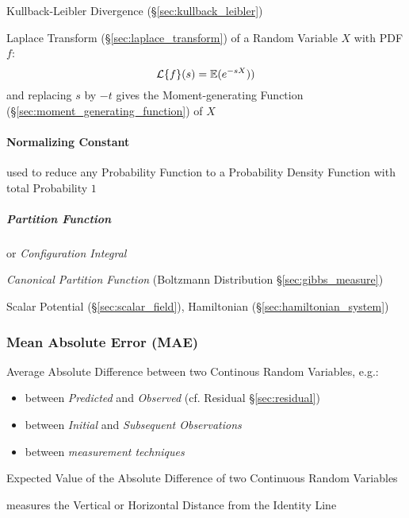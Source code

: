 \fist Kullback-Leibler Divergence (\S\ref{sec:kullback_leibler})

Laplace Transform (\S\ref{sec:laplace_transform}) of a Random Variable $X$ with
PDF $f$:
\[
  \mathcal{L}\{f\}(s) = \mathbb{E}(e^{-sX}))
\]
and replacing $s$ by $-t$ gives the Moment-generating Function
(\S\ref{sec:moment_generating_function}) of $X$



\paragraph{Normalizing Constant}\label{sec:normalizing_constant}\hfill

used to reduce any Probability Function to a Probability Density Function with
total Probability $1$





\subparagraph{Partition Function}\label{sec:partition_function}\hfill

or \emph{Configuration Integral}

\emph{Canonical Partition Function} (Boltzmann Distribution
\S\ref{sec:gibbs_measure})

Scalar Potential (\S\ref{sec:scalar_field}), Hamiltonian
(\S\ref{sec:hamiltonian_system})



\subsubsection{Mean Absolute Error (MAE)}\label{sec:mae}

Average Absolute Difference between two Continous Random Variables, e.g.:
\begin{itemize}
  \item between \emph{Predicted} and \emph{Observed} (cf. Residual
    \S\ref{sec:residual})
  \item between \emph{Initial} and \emph{Subsequent Observations}
  \item between \emph{measurement techniques}
\end{itemize}

Expected Value of the Absolute Difference of two Continuous Random Variables

measures the Vertical or Horizontal Distance from the Identity Line

